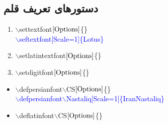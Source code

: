 \label{Sec:Xepersiancommands}
\subsection{دستورهای تعریف قلم}
\begin{plainslide}%
\begin{block}{\hfill {}}
\begin{latin}
\begin{enumerate}%
    \item \alert{$\backslash$settextfont$\left[\rm Options\right]$\{\}\hfill\textcolor{black}{}}\\ 
	{\textcolor{blue}{$\backslash$seftextfont[Scale=1]\{Lotus\}}\hfill\textcolor{black}{}}
    \item\alert{$\backslash$setlatintextfont$\left[\rm Options\right]$\{\}\hfill\textcolor{black}{}}\\  
    \item\alert{$\backslash$setdigitfont$\left[\rm Options\right]$\{\}\hfill\textcolor{black}{}}\\
\end{enumerate}
\end{latin}
\end{block}
\end{plainslide}
\begin{plainslide}
\begin{block}{\hfill{}}
\begin{latin}
\begin{itemize}%
    \item \alert{$\backslash$defpersianfont$\backslash$CS$\left[\rm Options\right]$\{\}\hfill\textcolor{black}{}}\\
{\textcolor{blue}{$\backslash$defpersianfont$\backslash$Nastaliq[Scale=1]\{IranNastaliq\}}\hfill\textcolor{black}{}}
    \item \alert{$\backslash$deflatinfont$\backslash$CS$\left[\rm Options\right]$\{\}\hfill\textcolor{black}{}}\\
\end{itemize}
\end{latin}
\end{block}

\end{plainslide}

